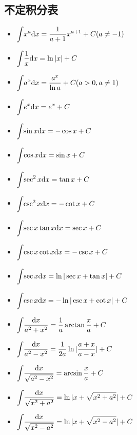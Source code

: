\subsection{不定积分表}
\begin{multicols}{2}
\begin{itemize}
\item $ \displaystyle\int_{}\hspace{.2em} x^{a}\mathrm{d}x=\frac{1}{a+1}x^{a+1}+C(a\neq -1) $
\item $ \displaystyle\int_{}\hspace{.2em} \frac{1}{x}\mathrm{d}x=\ln |x|+C $
\item $ \displaystyle\int_{}\hspace{.2em} a^{x}\mathrm{d}x=\frac{a^{x}}{\ln a}+C(a>0, a\neq 1) $
\item $ \displaystyle\int_{}\hspace{.2em}e^{x}\mathrm{d}x=e^{x}+C $
\item $ \displaystyle\int_{}\hspace{.2em}\sin x \mathrm{d}x=-\cos x+C $
\item $ \displaystyle\int_{}\hspace{.2em}\cos x \mathrm{d}x=\sin x+C $
\item $ \displaystyle\int_{}\hspace{.2em}\sec^{2}x \mathrm{d}x=\tan x+C $
\item $ \displaystyle\int_{}\hspace{.2em}\csc^{2}x \mathrm{d}x=-\cot x+C $
\item $ \displaystyle\int_{}\hspace{.2em}\sec x\tan x \mathrm{d}x=\sec x+C $
\item $ \displaystyle\int_{}\hspace{.2em}\csc x\cot x \mathrm{d}x=-\csc x+C $
\item $ \displaystyle\int_{}\hspace{.2em}\sec x \mathrm{d}x=\ln |\sec x+\tan x|+C $
\item $ \displaystyle\int_{}\hspace{.2em}\csc x \mathrm{d}x=-\ln|\csc x+\cot x|+C $
\item $ \displaystyle\int_{}\hspace{.2em}\frac{\mathrm{d}x}{a^{2}+x^{2}}=\frac{1}{a}\arctan \frac{x}{a}+C $
\item $ \displaystyle\int_{}\hspace{.2em}\frac{\mathrm{d}x}{a^{2}-x^{2}}=\frac{1}{2a}\ln |\frac{a+x}{a-x}|+C $
\item $ \displaystyle\int_{}\hspace{.2em}\frac{\mathrm{d}x}{\sqrt{a^{2}-x^{2}}}=\arcsin \frac{x}{a}+C $
\item $ \displaystyle\int_{}\hspace{.2em}\frac{\mathrm{d}x}{\sqrt{x^{2}+a^{2}}}=\ln|x+\sqrt{x^{2}+a^{2}}|+C $
\item $ \displaystyle\int_{}\hspace{.2em}\frac{\mathrm{d}x}{\sqrt{x^{2}-a^{2}}}=\ln|x+\sqrt{x^{2}-a^{2}}|+C $
\end{itemize}
\end{multicols}
